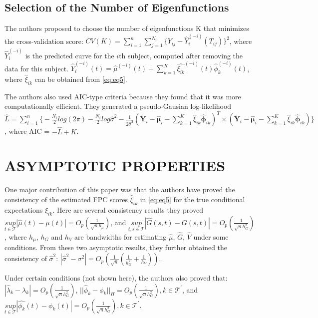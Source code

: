 \documentclass[11pt]{report}
\begin{document}
\subsection*{Selection of the Number of Eigenfunctions}
The authors proposed to choose the number of eigenfunctions K that minimizes the cross-validation score:
$%
	CV(K) = \sum_{i=1}^{n}\sum_{j=1}^{N_i}\{Y_{ij}-\widehat{Y}_i^{(-i)}(T_{ij})\}^2$,
where $\widehat{Y}_i^{(-i)}$ is the predicted curve for the $i$th subject, computed after removing the data for this subject.
$\widehat{Y}_i^{(-i)}(t) = \hat{\mu}^{(-i)}(t) + \sum_{k=1}^{K}\hat{\xi_{ik}}^{(-i)}(t)\hat{\phi}_{k}^{(-i)}(t)$, where $\hat{\xi}_{ik}$ can be obtained from \eqref{eq:eq5}.

The authors also used AIC-type criteria because they found that it was more computationally efficient. 
They generated a pseudo-Gausian log-likelihood 
$
	\widehat{L} = \sum_{i=1}^n\big\{-\frac{N_i}{2}log(2\pi) - \frac{N_i}{2}log\hat{\sigma}^2 - \frac{1}{2\hat{\sigma}^2}(\widetilde{\pmb{Y}}_i - \hat{\pmb{\mu}}_i - \sum_{k=1}^{K}\hat{\xi}_{ik}\hat{\pmb{\phi}}_{ik})^T \times (\widetilde{\pmb{Y}}_i - \hat{\pmb{\mu}}_i - \sum_{k=1}^{K}\hat{\xi}_{ik}\hat{\pmb{\phi}}_{ik}) \big\}
$, 
where AIC = $-\widehat{L} + K$.

\section{ASYMPTOTIC PROPERTIES}
One major contribution of this paper was that the authors have proved the consistency of the estimated FPC scores $\hat{\xi}_{ik}$ in \eqref{eq:eq5} for the true conditional expectations $\xi_{ik}$. 
Here are several consistency results they proved 
$\underset{t \in \mathcal{T}}{sup}|\hat{\mu}(t) - \mu(t)| = O_p \left(\frac{1}{\sqrt{n}h_{\mu}} \right)$, and $\underset{{t,s} \in \mathcal{T}}{sup}|\hat{G}(s,t) - G(s,t)| = O_p \left(\frac{1}{\sqrt{n}h_{G}^2} \right)$, where $h_{\mu}$, $h_G$ and $h_V$ are bandwidths for estimating $\hat{\mu}$, $\widehat{G}$, $\widehat{V}$ under some conditions. 
From these two asymptotic results, they further obtained the consistency of $\hat{\sigma}^2$: $|\hat{\sigma}^2 - \sigma^2| = O_p\left(\frac{1}{\sqrt{n}} \left(\frac{1}{h_G^2} + \frac{1}{h_V} \right) \right)$.

Under certain conditions (not shown here), the authors also proved that:
$|\hat{\lambda}_k - \lambda_k| = O_p \left(\frac{1}{\sqrt{n}h_{G}^2} \right) $,
$||\hat{\phi}_k - \phi_k||_H = O_p \left(\frac{1}{\sqrt{n}h_{G}^2} \right), k \in \mathcal{T}^{'}$, and $\underset{{t} \in \mathcal{T}}{sup}|\hat{\phi_k}(t) - \phi_k(t)| = O_p \left(\frac{1}{\sqrt{n}h_{G}^2} \right), k \in \mathcal{T}^{'}$. 
\end{document}
